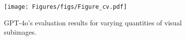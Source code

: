 \begin{figure}[h]
  \centering  \texttt{[image: Figures/figs/Figure\_cv.pdf]}
   \caption{GPT-4o's evaluation results for varying quantities of visual subimages.}
   \label{fig:cv}
\end{figure}